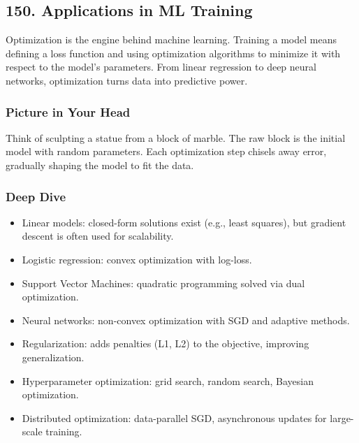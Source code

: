 \documentclass[
  letterpaper,
  DIV=11,
  numbers=noendperiod]{scrreprt}
\providecommand{\tightlist}{%
  \setlength{\itemsep}{0pt}\setlength{\parskip}{0pt}}
\begin{document}
\subsection{150. Applications in ML
Training}\label{applications-in-ml-training}

Optimization is the engine behind machine learning. Training a model
means defining a loss function and using optimization algorithms to
minimize it with respect to the model's parameters. From linear
regression to deep neural networks, optimization turns data into
predictive power.

\subsubsection{Picture in Your Head}\label{picture-in-your-head-149}

Think of sculpting a statue from a block of marble. The raw block is the
initial model with random parameters. Each optimization step chisels
away error, gradually shaping the model to fit the data.

\subsubsection{Deep Dive}\label{deep-dive-149}

\begin{itemize}
\tightlist
\item
  Linear models: closed-form solutions exist (e.g., least squares), but
  gradient descent is often used for scalability.
\item
  Logistic regression: convex optimization with log-loss.
\item
  Support Vector Machines: quadratic programming solved via dual
  optimization.
\item
  Neural networks: non-convex optimization with SGD and adaptive
  methods.
\item
  Regularization: adds penalties (L1, L2) to the objective, improving
  generalization.
\item
  Hyperparameter optimization: grid search, random search, Bayesian
  optimization.
\item
  Distributed optimization: data-parallel SGD, asynchronous updates for
  large-scale training.
\end{itemize}
\end{document}
